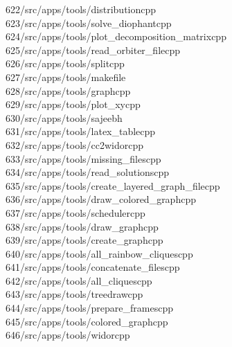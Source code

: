 \begin{tabbing}
622\>/src/apps/tools/distributioncpp\\[0pt]
623\>/src/apps/tools/solve\_diophantcpp\\[0pt]
624\>/src/apps/tools/plot\_decomposition\_matrixcpp\\[0pt]
625\>/src/apps/tools/read\_orbiter\_filecpp\\[0pt]
626\>/src/apps/tools/splitcpp\\[0pt]
627\>/src/apps/tools/makefile\\[0pt]
628\>/src/apps/tools/graphcpp\\[0pt]
629\>/src/apps/tools/plot\_xycpp\\[0pt]
630\>/src/apps/tools/sajeebh\\[0pt]
631\>/src/apps/tools/latex\_tablecpp\\[0pt]
632\>/src/apps/tools/cc2widorcpp\\[0pt]
633\>/src/apps/tools/missing\_filescpp\\[0pt]
634\>/src/apps/tools/read\_solutionscpp\\[0pt]
635\>/src/apps/tools/create\_layered\_graph\_filecpp\\[0pt]
636\>/src/apps/tools/draw\_colored\_graphcpp\\[0pt]
637\>/src/apps/tools/schedulercpp\\[0pt]
638\>/src/apps/tools/draw\_graphcpp\\[0pt]
639\>/src/apps/tools/create\_graphcpp\\[0pt]
640\>/src/apps/tools/all\_rainbow\_cliquescpp\\[0pt]
641\>/src/apps/tools/concatenate\_filescpp\\[0pt]
642\>/src/apps/tools/all\_cliquescpp\\[0pt]
643\>/src/apps/tools/treedrawcpp\\[0pt]
644\>/src/apps/tools/prepare\_framescpp\\[0pt]
645\>/src/apps/tools/colored\_graphcpp\\[0pt]
646\>/src/apps/tools/widorcpp\\[0pt]

\end{tabbing}
